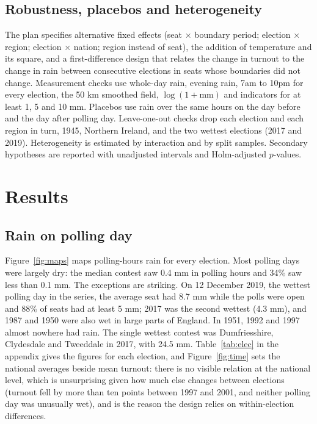 \documentclass[11pt,a4paper]{article}
\begin{document}
\subsection{Robustness, placebos and heterogeneity}
The plan specifies alternative fixed effects (seat $\times$ boundary period; election $\times$ region; election $\times$ nation; region instead of seat), the addition of temperature and its square, and a first-difference design that relates the change in turnout to the change in rain between consecutive elections in seats whose boundaries did not change. Measurement checks use whole-day rain, evening rain, 7am to 10pm for every election, the 50 km smoothed field, $\log(1+\text{mm})$ and indicators for at least 1, 5 and 10 mm. Placebos use rain over the same hours on the day before and the day after polling day. Leave-one-out checks drop each election and each region in turn, 1945, Northern Ireland, and the two wettest elections (2017 and 2019). Heterogeneity is estimated by interaction and by split samples. Secondary hypotheses are reported with unadjusted intervals and Holm-adjusted $p$-values.

\section{Results}\label{sec:results}
\subsection{Rain on polling day}
Figure~\ref{fig:maps} maps polling-hours rain for every election. Most polling days were largely dry: the median contest saw 0.4 mm in polling hours and 34\% saw less than 0.1 mm. The exceptions are striking. On 12 December 2019, the wettest polling day in the series, the average seat had 8.7 mm while the polls were open and 88\% of seats had at least 5 mm; 2017 was the second wettest (4.3 mm), and 1987 and 1950 were also wet in large parts of England. In 1951, 1992 and 1997 almost nowhere had rain. The single wettest contest was Dumfriesshire, Clydesdale and Tweeddale in 2017, with 24.5 mm. Table~\ref{tab:elec} in the appendix gives the figures for each election, and Figure~\ref{fig:time} sets the national averages beside mean turnout: there is no visible relation at the national level, which is unsurprising given how much else changes between elections (turnout fell by more than ten points between 1997 and 2001, and neither polling day was unusually wet), and is the reason the design relies on within-election differences.
\end{document}

